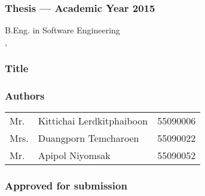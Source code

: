 \thispagestyle{empty}

\begin{flushleft}
\subsubsection{\Large{Thesis --- Academic Year 2015}}
B.Eng. in Software Engineering \\
\IC, \kmitl

\vspace{2cm}

\subsubsection{\Large{Title}}
\dms

\vspace{1cm}
\subsubsection{\Large{Authors}}
\begin{tabular}{lll}
Mr. & Kittichai Lerdkitphaiboon & 55090006 \\
Mrs. & Duangporn Temcharoen & 55090022 \\
Mr. & Apipol Niyomsak & 55090052
\end{tabular}
\end{flushleft}

\vfill

\begin{flushright}
\subsubsection{\Large{Approved for submission}}
\vspace{1cm}
\vspace{1cm}
 \\
\end{flushright}